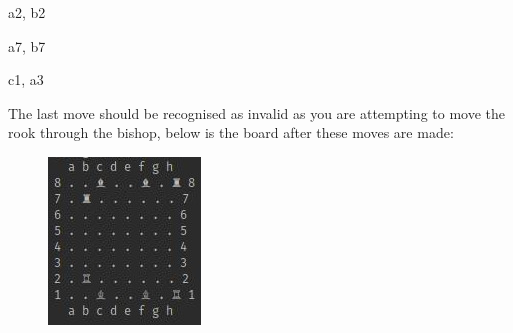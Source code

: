 \documentclass[a4paper]{article}
\begin{document}
\noindent a2, b2

\noindent a7, b7

\noindent c1, a3

The last move should be recognised as invalid as you are attempting to move the rook through the bishop, below is the board after these moves are made:
\begin{figure}[H]
\centering
\includegraphics[scale=2.5]{rookObstruction}
\end{figure}
\end{document}
